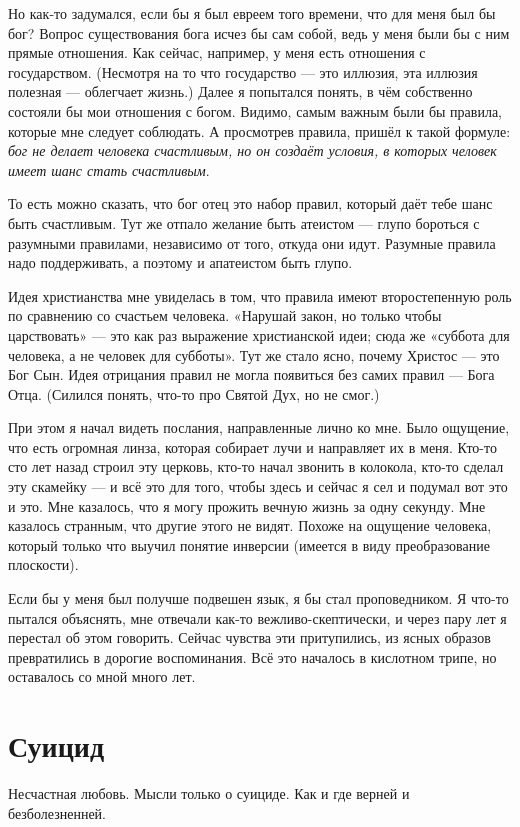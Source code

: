\documentclass{book}
\begin{document}
Но как-то задумался, если бы я был евреем того времени, что для меня был бы бог?
Вопрос существования бога исчез бы сам собой, ведь у меня были бы с ним прямые отношения.
Как сейчас, например, у меня есть отношения с государством. 
(Несмотря на то что государство --- это иллюзия, эта иллюзия полезная --- облегчает жизнь.)
Далее я попытался понять, в чём собственно состояли бы мои отношения с богом.
Видимо, самым важным были бы правила, которые мне следует соблюдать.
А просмотрев правила, пришёл к такой формуле: \emph{бог не делает человека счастливым, но он создаёт условия, в которых человек имеет шанс стать счастливым}.

То есть можно сказать, что бог отец это набор правил, который даёт тебе шанс быть счастливым.
Тут же отпало желание быть атеистом --- глупо бороться с разумными правилами, независимо от того, откуда они идут.
Разумные правила надо поддерживать, а поэтому и апатеистом быть глупо.

Идея христианства мне увиделась в том, что правила имеют второстепенную роль по сравнению со счастьем человека.
«Нарушай закон, но только чтобы царствовать» --- это как раз выражение христианской идеи;
сюда же «суббота для человека, а не человек для субботы».
Тут же стало ясно, почему Христос --- это Бог Сын.
Идея отрицания правил не могла появиться без самих правил --- Бога Отца.
(Силился понять, что-то про Святой Дух, но не смог.)

При этом я начал видеть послания, направленные лично ко мне.
Было ощущение, что есть огромная линза, которая собирает лучи и направляет их в меня.
Кто-то сто лет назад строил эту церковь, кто-то начал звонить в колокола, кто-то сделал эту скамейку --- и всё это для того, чтобы здесь и сейчас я сел и подумал вот это и это.
Мне казалось, что я могу прожить вечную жизнь за одну секунду.
Мне казалось странным, что другие этого не видят.
Похоже на ощущение человека, который только что выучил понятие инверсии (имеется в виду преобразование плоскости).

Если бы у меня был получше подвешен язык, я бы стал проповедником.
Я что-то пытался объяснять, мне отвечали как-то вежливо-скептически, и через пару лет я перестал об этом говорить.
Сейчас чувства эти притупились, из ясных образов превратились в дорогие воспоминания.
Всё это началось в кислотном трипе, но оставалось со мной много лет.

\section*{Суицид}
Несчастная любовь.
Мысли только о суициде.
Как и где верней и безболезненней.
\end{document}
